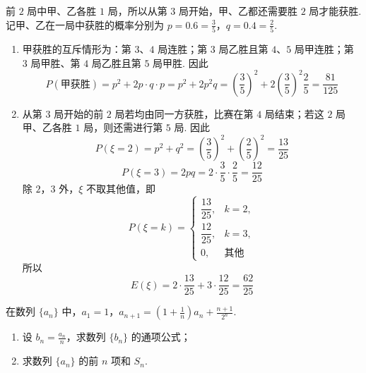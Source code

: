\begin{solution}
前 \(2\) 局中甲、乙各胜 \(1\) 局，所以从第 \(3\) 局开始，甲、乙都还需要胜 \(2\) 局才能获胜. 记甲、乙在一局中获胜的概率分别为 \(p=0.6=\frac{3}{5}\)，\(q=0.4=\frac{2}{5}\).

\begin{enumerate}
\item 甲获胜的互斥情形为：第 \(3\)、\(4\) 局连胜；第 \(3\) 局乙胜且第 \(4\)、\(5\) 局甲连胜；第 \(3\) 局甲胜、第 \(4\) 局乙胜且第 \(5\) 局甲胜. 因此
\[
P(\text{甲获胜})=p^2+2p\cdot q\cdot p=p^2+2p^2q
=\left(\frac{3}{5}\right)^2+2\left(\frac{3}{5}\right)^2\frac{2}{5}
=\frac{81}{125}
\]

\item 从第 \(3\) 局开始的前 \(2\) 局若均由同一方获胜，比赛在第 \(4\) 局结束；若这 \(2\) 局甲、乙各胜 \(1\) 局，则还需进行第 \(5\) 局. 因此
\[
P(\xi=2)=p^2+q^2
=\left(\frac{3}{5}\right)^2+\left(\frac{2}{5}\right)^2
=\frac{13}{25}
\]
\[
P(\xi=3)=2pq
=2\cdot\frac{3}{5}\cdot\frac{2}{5}
=\frac{12}{25}
\]
除 \(2\)，\(3\) 外，\(\xi\) 不取其他值，即
\[
P(\xi=k)=
\begin{cases}
\dfrac{13}{25},&k=2,\\
\dfrac{12}{25},&k=3,\\
0,&\text{其他}
\end{cases}
\]
所以
\[
E(\xi)=2\cdot\frac{13}{25}+3\cdot\frac{12}{25}=\frac{62}{25}
\]
\end{enumerate}
\end{solution}

\begin{problem}
在数列 \(\{a_{n}\}\) 中，\(a_{1} = 1\)，\(a_{n+1} = \left(1 + \frac{1}{n}\right)a_{n} + \frac{n+1}{2^{n}}\).
\begin{enumerate}
\item 设 \(b_{n}=\frac{a_{n}}{n}\)，求数列 \(\{b_{n}\}\) 的通项公式；
\item 求数列 \(\{a_{n}\}\) 的前 \(n\) 项和 \(S_{n}\).
\end{enumerate}
\end{problem}

